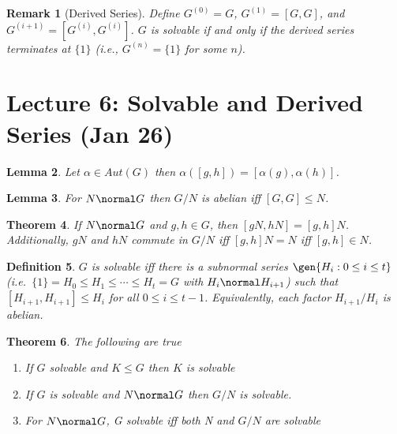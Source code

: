 \documentclass[a4paper,12pt]{article}
\newtheorem{thm}{Theorem}[section]
\newtheorem{lem}[thm]{Lemma}
\newtheorem{defn}[thm]{Definition}
\newtheorem{rmk}[thm]{Remark}
\begin{document}
\begin{rmk}[Derived Series]
    Define $G^{(0)} = G$, $G^{(1)} = [G,G]$, and $G^{(i+1)} = [G^{(i)}, G^{(i)}]$.
    $G$ is solvable if and only if the derived series terminates at $\{1\}$ (i.e., $G^{(n)} = \{1\}$ for some $n$).
\end{rmk}
\newpage
\section{Lecture 6: Solvable and Derived Series (Jan 26)}
\begin{lem}
    Let $\alpha\in Aut(G)$ then $\alpha([g,h])=[\alpha(g),\alpha(h)]$.
\end{lem}
\begin{lem}
    For $N \normal G$ then $G/N$ is abelian iff $[G,G]\leq N$.
\end{lem}
\begin{thm}
    If $N\normal G$ and $g,h\in G$, then $[gN,hN]=[g,h]N$. Additionally, $gN$ and $hN$ commute in $G/N$ iff $[g,h]N=N$ iff $[g,h]\in N$. 
\end{thm}
\begin{defn}
    $G$ is solvable iff there is a subnormal series $\gen{H_i : 0\leq i \leq t}$ (i.e.\ $\{1\}=H_0\leq H_1\leq\cdots\leq H_t=G$ with $H_i\normal H_{i+1}$) such that $[H_{i+1},H_{i+1}]\leq H_i$ for all $0\leq i \leq t-1$. Equivalently, each factor $H_{i+1}/H_i$ is abelian.
\end{defn}
\begin{thm}
    The following are true
    \begin{enumerate}
        \item If $G$ solvable and $K\leq G$ then $K$ is solvable
        \item If $G$ is solvable and $N\normal G$ then $G/N$ is solvable. 
        \item For $N \normal G$, G solvable iff both N and $G/N$ are solvable
    \end{enumerate}
\end{thm}
\end{document}
